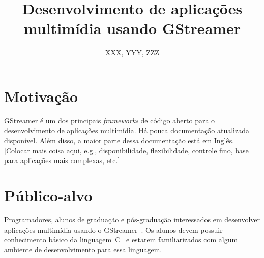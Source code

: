 \documentclass{SBCbookchapter}
\title{Desenvolvimento de aplicações multimídia usando GStreamer}
\author{XXX, YYY, ZZZ}
\begin{document}
\maketitle
\begin{abstract}
\begin{otherlanguage}{english}
\end{otherlanguage}
\end{abstract}

\begin{resumo}
\end{resumo}


\section{Motivação}

GStreamer é um dos principais \emph{frameworks} de código aberto para o
desenvolvimento de aplicações multimídia.  Há pouca documentação atualizada
disponível.  Além disso, a maior parte dessa documentação está em Inglês.
[Colocar mais coisa aqui, e.g., disponibilidade, flexibilidade, controle
  fino, base para aplicações mais complexas, etc.]


\section{Público-alvo}

Programadores, alunos de graduação e pós-graduação interessados em
desenvolver aplicações multimídia usando o GStreamer~\cite{?}.  Os alunos
devem possuir conhecimento básico da linguagem~C~\cite{?} e estarem
familiarizados com algum ambiente de desenvolvimento para essa linguagem.


\end{document}
